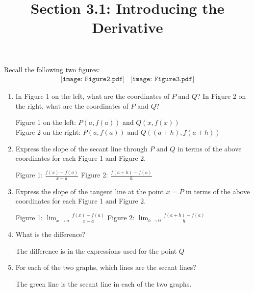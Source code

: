 \documentclass[nooutcomes]{ximera}
\title{Section 3.1: Introducing the Derivative}
\begin{document}
\begin{abstract}		\end{abstract}
\maketitle

\begin{problem}
 Recall the following two figures:
  \[
    \begin{array}{lr}
      \texttt{[image: Figure2.pdf]} &		   \texttt{[image: Figure3.pdf]}
    \end{array}
  \]
  \begin{enumerate}
    \item
      In Figure 1 on the left, what are the coordinates of $P$ and $Q$?  In Figure 2 on the right, what are the coordinates of $P$ and $Q$?

	\begin{freeResponse}
	Figure 1 on the left: $P(a,f(a))$ and $Q(x,f(x))$ \\
	Figure 2 on the right: $P(a,f(a))$ and $Q((a+h),f(a+h))$

	\end{freeResponse}

	\item Express the slope of the secant line through $P$ and $Q$ in terms of the above coordinates for each Figure 1 and Figure 2.

      \begin{freeResponse}
	Figure 1: $\frac{f(x)-f(a)}{x-a}$ 
	Figure 2: $\frac{f(a+h)-f(a)}{h}$
        \end{freeResponse}
	
	\item
	Express the slope of the tangent line at the point $x=P$ in terms of the above coordinates for each Figure 1 and Figure 2.

	\begin{freeResponse}
        	Figure 1:  $ \lim_{x \to a} \frac{f(x)-f(a)}{x-a}$
	Figure 2: $\lim_{h \to 0} \frac{f(a+h)-f(a)}{h}$
      \end{freeResponse}

    \item 
      What is the difference?
      \begin{freeResponse}
	The difference is in the expressions used for the point $Q$
      \end{freeResponse}


    \item 
      For each of the two graphs, which lines are the secant lines?
      \begin{freeResponse}
        The green line is the secant line in each of the two graphs.        
      \end{freeResponse}


\end{enumerate}
\end{problem}
\end{document}
